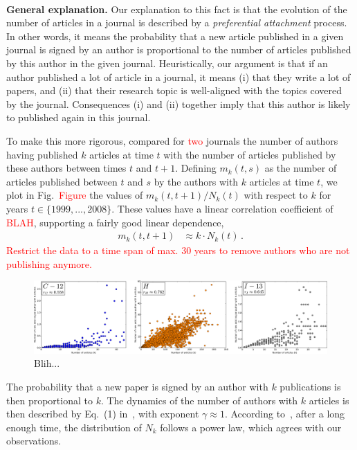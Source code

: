 \documentclass[9pt,twocolumn,twoside]{pnas-new}
\begin{document}
\paragraph{}
{\bf General explanation. }
Our explanation to this fact is that the evolution of the number of articles in a journal is described by a \emph{preferential attachment} process. 
In other words, it means the probability that a new article published in a given journal 
is signed by an author is proportional to the number of articles published by this author in the given journal. 
Heuristically, our argument is that if an author published a lot of article in a journal, it means (i) that they write a lot of papers, 
and (ii) that their research topic is well-aligned with the topics covered by the journal. 
Consequences (i) and (ii) together imply that this author is likely to published again in this journal. 

To make this more rigorous, compared for \textcolor{red}{two} journals the number of authors having published $k$ articles at time $t$ 
with the number of articles published by these authors between times $t$ and $t+1$. 
Defining $m_k(t,s)$ as the number of articles published between $t$ and $s$ by the authors with $k$ articles at time $t$, we plot in Fig.~\textcolor{red}{Figure} the values of 
$m_k(t,t+1)/N_k(t)$ with respect to $k$ for years $t\in\{1999,...,2008\}$. 
These values have a linear correlation coefficient of \textcolor{red}{BLAH}, supporting a fairly good linear dependence, 
\begin{align}
 m_k(t,t+1) &\approx k\cdot N_k(t)\, . 
\end{align}
\textcolor{red}{Restrict the data to a time span of max. 30 years to remove authors who are not publishing anymore.}

\begin{figure}
 \centering
 \includegraphics[width=\textwidth]{../figures/CHI_correl.pdf}
 \caption{Blih...}
 \label{fig:2}
\end{figure}


The probability that a new paper is signed by an author with $k$ publications is then proportional to $k$. 
The dynamics of the number of authors with $k$ articles is then described by Eq.~(1) in~\cite{Kra00}, with exponent $\gamma\approx 1$. 
According to~\cite{Kra00}, after a long enough time, the distribution of $N_k$ follows a power law, which agrees with our observations.
\end{document}

